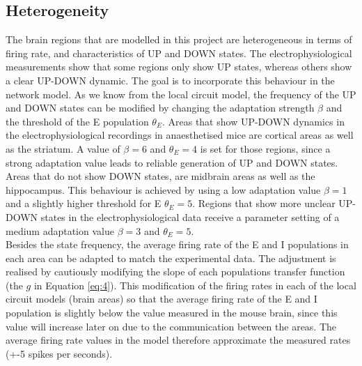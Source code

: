 \subsection{Heterogeneity}
\noindent
\indent The brain regions that are modelled in this project are heterogeneous in terms of firing rate, and characteristics of UP and DOWN states. The electrophysiological measurements show that some regions only show UP states, whereas others show a clear UP-DOWN dynamic. The goal is to incorporate this behaviour in the network model. As we know from the local circuit model, the frequency of the UP and DOWN states can be modified by changing the adaptation strength $\beta$ and the threshold of the E population $\theta_E$. Areas that show UP-DOWN dynamics in the electrophysiological recordings in anaesthetised mice are cortical areas as well as the striatum. A value of $\beta = 6$ and $\theta_E = 4$ is set for those regions, since a strong adaptation value leads to reliable generation of UP and DOWN states. Areas that do not show DOWN states, are midbrain areas as well as the hippocampus. This behaviour is achieved by using a low adaptation value $\beta = 1$ and a slightly higher threshold for E $\theta_E = 5$. Regions that show more unclear UP-DOWN states in the electrophysiological data receive a parameter setting of a medium adaptation value $\beta = 3$ and $\theta_E = 5$.
\\
\indent Besides the state frequency, the average firing rate of the E and I populations in each area can be adapted to match the experimental data. The adjustment is realised by cautiously modifying the slope of each populations transfer function (the $g$ in Equation \ref{eq:4}). This modification of the firing rates in each of the local circuit models (brain areas) so that the average firing rate of the E and I population is slightly below the value measured in the mouse brain, since this value will increase later on due to the communication between the areas. The average firing rate values in the model therefore approximate the measured rates (+-5 spikes per seconds).  
